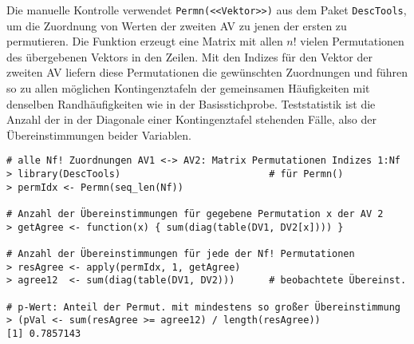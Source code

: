 Die manuelle Kontrolle verwendet \lstinline!Permn(<<Vektor>>)! aus dem Paket \lstinline!DescTools!, um die Zuordnung von Werten der zweiten AV zu jenen der ersten zu permutieren. Die Funktion erzeugt eine Matrix mit allen $n!$ vielen Permutationen des übergebenen Vektors in den Zeilen. Mit den Indizes für den Vektor der zweiten AV liefern diese Permutationen die gewünschten Zuordnungen und führen so zu allen möglichen Kontingenztafeln der gemeinsamen Häufigkeiten mit denselben Randhäufigkeiten wie in der Basisstichprobe. Teststatistik ist die Anzahl der in der Diagonale einer Kontingenztafel stehenden Fälle, also der Übereinstimmungen beider Variablen.
\begin{lstlisting}
# alle Nf! Zuordnungen AV1 <-> AV2: Matrix Permutationen Indizes 1:Nf
> library(DescTools)                          # für Permn()
> permIdx <- Permn(seq_len(Nf))

# Anzahl der Übereinstimmungen für gegebene Permutation x der AV 2
> getAgree <- function(x) { sum(diag(table(DV1, DV2[x]))) }

# Anzahl der Übereinstimmungen für jede der Nf! Permutationen
> resAgree <- apply(permIdx, 1, getAgree)
> agree12  <- sum(diag(table(DV1, DV2)))      # beobachtete Übereinst.

# p-Wert: Anteil der Permut. mit mindestens so großer Übereinstimmung
> (pVal <- sum(resAgree >= agree12) / length(resAgree))
[1] 0.7857143
\end{lstlisting}
